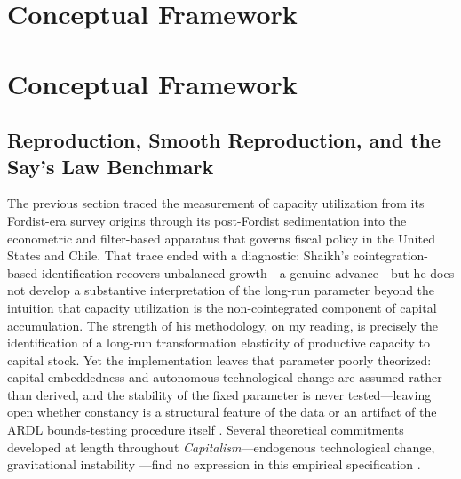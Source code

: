 ﻿\section{Conceptual Framework}



\section{Conceptual Framework}


\subsection{Reproduction, Smooth Reproduction, and the Say's Law Benchmark}
\label{sec:reproduction}

The previous section traced the measurement of capacity utilization from its Fordist-era survey origins through its post-Fordist sedimentation into the econometric and filter-based apparatus that governs fiscal policy in the United States and Chile. That trace ended with a diagnostic: Shaikh's cointegration-based identification recovers unbalanced growth---a genuine advance---but he does not develop a substantive interpretation of the long-run parameter beyond the intuition that capacity utilization is the non-cointegrated component of capital accumulation. The strength of his methodology, on my reading, is precisely the identification of a long-run transformation elasticity of productive capacity to capital stock. Yet the implementation leaves that parameter poorly theorized: capital embeddedness and autonomous technological change are assumed rather than derived, and the stability of the fixed parameter is never tested---leaving open whether constancy is a structural feature of the data or an artifact of the ARDL bounds-testing procedure itself \citep{Pesaran2001}. Several theoretical commitments developed at length throughout \emph{Capitalism}---endogenous technological change, gravitational instability ---find no expression in this empirical specification \citep{Shaikh2016}.

